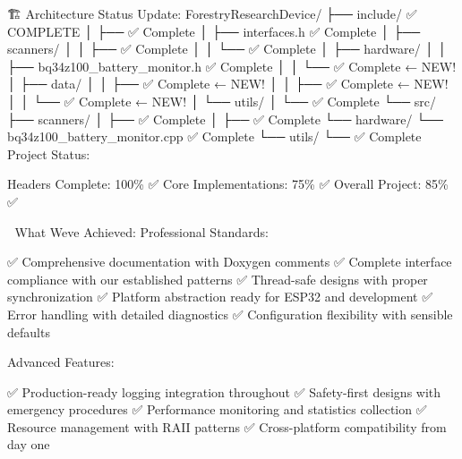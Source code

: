 🏗️ Architecture Status Update\+: Forestry\+Research\+Device/ ├── include/ ✅ COMPLETE │ ├──  ✅ Complete │ ├── interfaces.\+h ✅ Complete │ ├── scanners/ │ │ ├──  ✅ Complete │ │ └──  ✅ Complete │ ├── hardware/ │ │ ├── bq34z100\+\_\+battery\+\_\+monitor.\+h ✅ Complete │ │ └──  ✅ Complete ← NEW! │ ├── data/ │ │ ├──  ✅ Complete ← NEW! │ │ ├──  ✅ Complete ← NEW! │ │ └──  ✅ Complete ← NEW! │ └── utils/ │ └──  ✅ Complete └── src/ ├── scanners/ │ ├──  ✅ Complete │ ├──  ✅ Complete └── hardware/ └── bq34z100\+\_\+battery\+\_\+monitor.\+cpp ✅ Complete └── utils/ └──  ✅ Complete 🎯 Project Status\+:

Headers Complete\+: 100\% ✅ Core Implementations\+: 75\% ✅ Overall Project\+: 85\% ✅

🚀 What We\textquotesingle{}ve Achieved\+: Professional Standards\+:

✅ Comprehensive documentation with Doxygen comments ✅ Complete interface compliance with our established patterns ✅ Thread-\/safe designs with proper synchronization ✅ Platform abstraction ready for ESP32 and development ✅ Error handling with detailed diagnostics ✅ Configuration flexibility with sensible defaults

Advanced Features\+:

✅ Production-\/ready logging integration throughout ✅ Safety-\/first designs with emergency procedures ✅ Performance monitoring and statistics collection ✅ Resource management with RAII patterns ✅ Cross-\/platform compatibility from day one 